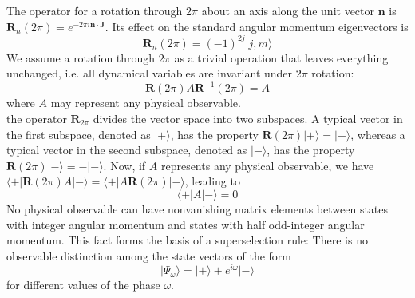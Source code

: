 \documentclass[cyan]{elegantnote}
\begin{document}
The operator for a rotation through $2\pi$ about an axis
along the unit vector $\bm{n}$ is $\bm{R}_n(2\pi) = e^{-2\pi i\bm{n}\cdot\bm{J}}$. Its effect on the standard angular momentum eigenvectors is
\[\bm{R}_n(2\pi) = (-1)^{2j}|j,m\rangle \]
We assume a rotation through $2\pi$ as a trivial operation that leaves everything unchanged, i.e. all dynamical variables are invariant under $2\pi$ rotation:
\[\bm{R}(2\pi) A \bm{R}^{-1}(2\pi) = A\]
where $A$ may represent any physical observable. \\
the operator $\bm{R}_{2\pi}$ divides the vector space into two subspaces. A typical vector in the first subspace,
denoted as $|+\rangle$, has the property $\bm{R}(2\pi)|+\rangle = |+\rangle$, whereas a typical vector in the second subspace, denoted as $|-\rangle$, has the property $\bm{R}(2\pi)|-\rangle = -|-\rangle$. Now, if $A$ represents any physical observable, we have $\langle + | \bm{R}(2\pi) A| - \rangle = \langle + | A\bm{R}(2\pi)| - \rangle$, leading to 
\[\langle + | A | - \rangle = 0\] 
No physical observable can have nonvanishing matrix elements between states with integer angular momentum and states with half odd-integer angular momentum. This fact forms the basis of a superselection rule: There is no observable distinction among the state vectors of the form\\
\[|\Psi_{\omega}\rangle = |+\rangle + e^{i\omega}|-\rangle\]
for different values of the phase $\omega$.
\end{document}
